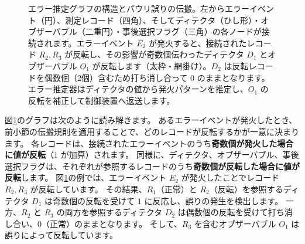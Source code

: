 \begin{figure}[htbp]
  \caption{エラー推定グラフの構造とパウリ誤りの伝搬。左からエラーイベント（円）、測定レコード（四角）、そしてディテクタ（ひし形）・オブザーバブル（二重円）・事後選択フラグ（三角）の各ノードが接続されます。エラーイベント $E_2$ が発火すると、接続されたレコード $R_2, R_3$ が反転し、その影響が奇数個伝わったディテクタ $D_1$ とオブザーバブル $O_1$ が反転します（太枠・網掛け）。$D_2$ は反転レコードを偶数個（2個）含むため打ち消し合って $0$ のままとなります。エラー推定器はディテクタの値から発火パターンを推定し、$O_1$ の反転を補正して制御装置へ返送します。}
  \label{fig:ch2_error_graph}
\end{figure}

図\ref{fig:ch2_error_graph}のグラフは次のように読み解きます。
あるエラーイベントが発火したとき、前小節の伝搬規則を適用することで、どのレコードが反転するかが一意に決まります。
各レコードは、接続されたエラーイベントのうち\textbf{奇数個が発火した場合に値が反転}（$1$ が加算）されます。
同様に、ディテクタ、オブザーバブル、事後選択フラグは、それぞれが参照するレコードのうち\textbf{奇数個が反転した場合に値が反転}します。
図\ref{fig:ch2_error_graph}の例では、エラーイベント $E_2$ が発火したことでレコード $R_2, R_3$ が反転しています。
その結果、$R_1$（正常）と $R_2$（反転）を参照するディテクタ $D_1$ は奇数個の反転を受けて $1$ に反応し、誤りの発生を検出します。
一方、$R_2$ と $R_3$ の両方を参照するディテクタ $D_2$ は偶数個の反転を受けて打ち消し合い、$0$（正常）のままとなります。
そして、$R_3$ を含むオブザーバブル $O_1$ は誤りによって反転しています。

